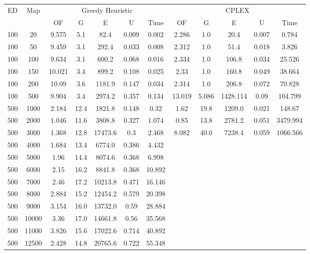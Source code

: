 \begin{table}[htb]
	\centering
	\begin{tabular}{|c|c|c|c|c|c|c|c|c|c|c|c|}
		\hline
		\multirow{2}{*}{ED} & \multirow{2}{*}{Map} & \multicolumn{5}{c|}{Greedy Heuristic} & \multicolumn{5}{c|}{CPLEX}\\ 
		\cline{3-12}
&& OF & G & E & U & Time & OF & G & E & U & Time\\ 
		\hline
		100 & 20 & 9.575 & 5.1 & 82.4 & 0.009 & 0.002 & 2.286 & 1.0 & 20.4 & 0.007 & 0.784 \\ 
		100 & 50 & 9.459 & 3.1 & 292.4 & 0.033 & 0.008 & 2.312 & 1.0 & 51.4 & 0.018 & 3.826 \\ 
		100 & 100 & 9.634 & 3.1 & 600.2 & 0.068 & 0.016 & 2.334 & 1.0 & 106.8 & 0.034 & 25.526 \\ 
		100 & 150 & 10.021 & 3.4 & 899.2 & 0.108 & 0.025 & 2.33 & 1.0 & 160.8 & 0.049 & 38.664 \\ 
		100 & 200 & 10.09 & 3.6 & 1181.9 & 0.147 & 0.034 & 2.314 & 1.0 & 206.8 & 0.072 & 70.828 \\ 
		100 & 500 & 9.904 & 3.4 & 2974.2 & 0.357 & 0.134 & 13.019 & 5.086 & 1428.114 & 0.09 & 104.799 \\ 
		500 & 1000 & 2.184 & 12.4 & 1821.8 & 0.148 & 0.32 & 1.62 & 19.8 & 1209.0 & 0.021 & 148.67 \\ 
		500 & 2000 & 1.046 & 11.6 & 3808.8 & 0.327 & 1.074 & 0.85 & 13.8 & 2781.2 & 0.051 & 3479.994 \\ 
		500 & 3000 & 1.368 & 12.8 & 17473.6 & 0.3 & 2.468 & 8.082 & 40.0 & 7238.4 & 0.059 & 1066.566 \\ 
		500 & 4000 & 1.684 & 13.4 & 6774.0 & 0.386 & 4.432 & & & & &  \\ 
		500 & 5000 & 1.96 & 14.4 & 8074.6 & 0.368 & 6.998 & & & & &  \\ 
		500 & 6000 & 2.15 & 16.2 & 8841.8 & 0.368 & 10.892 & & & & &  \\ 
		500 & 7000 & 2.46 & 17.2 & 10213.8 & 0.471 & 16.146 & & & & &  \\ 
		500 & 8000 & 2.884 & 15.2 & 12454.2 & 0.579 & 20.398 & & & & &  \\ 
		500 & 9000 & 3.154 & 16.0 & 13732.0 & 0.59 & 28.884 & & & & &  \\ 
		500 & 10000 & 3.36 & 17.0 & 14661.8 & 0.56 & 35.568 & & & & &  \\ 
		500 & 11000 & 3.826 & 15.6 & 17022.6 & 0.714 & 40.892 & & & & &  \\ 
		500 & 12500 & 2.428 & 14.8 & 20765.6 & 0.722 & 55.348 & & & & &  \\ 

\end{tabular}
\end{table}
